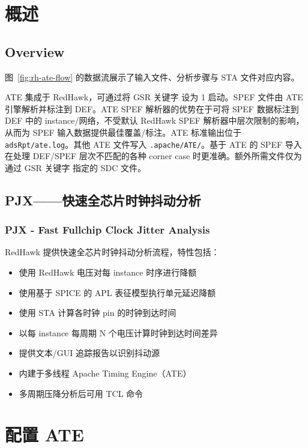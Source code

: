 \section{概述}
\subsection*{Overview}

图~\ref{fig:rh-ate-flow} 的数据流展示了输入文件、分析步骤与 STA 文件对应内容。

\label{fig:rh-ate-flow}

ATE 集成于 RedHawk，可通过将 GSR 关键字  设为 1 启动。SPEF 文件由 ATE 引擎解析并标注到 DEF。ATE SPEF 解析器的优势在于可将 SPEF 数据标注到 DEF 中的 instance/网络，不受默认 RedHawk SPEF 解析器中层次限制的影响，从而为 SPEF 输入数据提供最佳覆盖/标注。ATE 标准输出位于 \texttt{adsRpt/ate.log}。其他 ATE 文件写入 \texttt{.apache/ATE/}。基于 ATE 的 SPEF 导入在处理 DEF/SPEF 层次不匹配的各种 corner case 时更准确。额外所需文件仅为通过 GSR 关键字  指定的 SDC 文件。

\subsection{PJX——快速全芯片时钟抖动分析}
\subsubsection*{PJX - Fast Fullchip Clock Jitter Analysis}

RedHawk 提供快速全芯片时钟抖动分析流程，特性包括：
\begin{itemize}
  \item 使用 RedHawk 电压对每 instance 时序进行降额
  \item 使用基于 SPICE 的 APL 表征模型执行单元延迟降额
  \item 使用 STA 计算各时钟 pin 的时钟到达时间
  \item 以每 instance 每周期 N 个电压计算时钟到达时间差异
  \item 提供文本/GUI 追踪报告以识别抖动源
  \item 内建于多线程 Apache Timing Engine（ATE）
  \item 多周期压降分析后可用 TCL 命令 
\end{itemize}

\section{配置 ATE}
